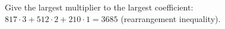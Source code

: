 Give the largest multiplier to the largest coefficient: $817\cdot3+512\cdot2+210\cdot1=\boxed{3685}$ (rearrangement inequality).
